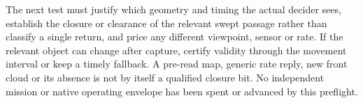 \documentclass[11pt]{article}
\begin{document}
The next test must justify which geometry and timing the actual
decider sees, establish the closure or clearance of the relevant
swept passage rather than classify a single return, and price
any different viewpoint, sensor or rate. If the relevant object
can change after capture, certify validity through the movement
interval or keep a timely fallback. A pre-read map, generic
rate reply, new front cloud or its absence is not by itself a
qualified closure bit. No independent mission or native operating
envelope has been spent or advanced by this preflight.
\end{document}
